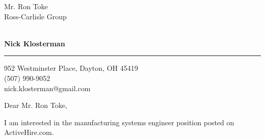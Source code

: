 \documentclass{letter} %
\makeatletter
\newcommand{\contactperson}{Mr. Ron Toke}
\newcommand{\contactCompany}{Ross-Carlisle Group}
\newcommand{\contactStreetAddress}{ }  %
\newcommand{\contactCityStateZip}{ }
\newcommand{\position}{manufacturing systems engineer }%
\newcommand{\jobpostingsource}{ActiveHire.com} %
\newcommand{\personalphonenumber}{(507) 990-9052}
\newcommand{\personalemail}{nick.klosterman@gmail.com}
\makeatother
\begin{document}
\signature{Nick Klosterman}           %
\longindentation=0pt                       %
\let\raggedleft\raggedright                %
 

 
\begin{letter}{\contactperson \\
\contactCompany \\
\contactStreetAddress \\
\contactCityStateZip

}

  \begin{flushright}
 \hfill   \large\bf Nick Klosterman  \\
\end{flushright}
\begin{flushright}
    \medskip\hrule height 1pt
    \hfill 952 Westminster Place, Dayton, OH 45419 \\
    \hfill \personalphonenumber \\
    \hfill \personalemail
  \end{flushright} 
\vfill %

 
\opening{Dear \contactperson ,} 

\noindent 
I am interested in the \position position posted on \jobpostingsource. 


\end{letter}
\end{document}
